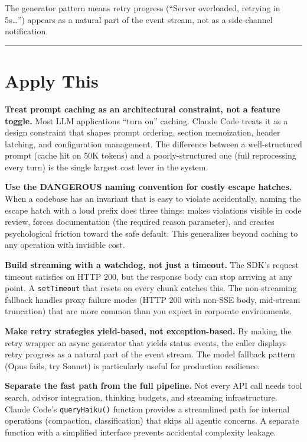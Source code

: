 \documentclass[
  english,
  11pt,
  letterpaper,
]{book}
\begin{document}
The generator pattern means retry progress (``Server overloaded,
retrying in 5s\ldots{}'') appears as a natural part of the event stream,
not as a side-channel notification.

\begin{center}\rule{0.5\linewidth}{0.5pt}\end{center}

\section{Apply This}\label{apply-this-3}

\textbf{Treat prompt caching as an architectural constraint, not a
feature toggle.} Most LLM applications ``turn on'' caching. Claude Code
treats it as a design constraint that shapes prompt ordering, section
memoization, header latching, and configuration management. The
difference between a well-structured prompt (cache hit on 50K tokens)
and a poorly-structured one (full reprocessing every turn) is the single
largest cost lever in the system.

\textbf{Use the DANGEROUS naming convention for costly escape hatches.}
When a codebase has an invariant that is easy to violate accidentally,
naming the escape hatch with a loud prefix does three things: makes
violations visible in code review, forces documentation (the required
reason parameter), and creates psychological friction toward the safe
default. This generalizes beyond caching to any operation with invisible
cost.

\textbf{Build streaming with a watchdog, not just a timeout.} The SDK's
request timeout satisfies on HTTP 200, but the response body can stop
arriving at any point. A \texttt{setTimeout} that resets on every chunk
catches this. The non-streaming fallback handles proxy failure modes
(HTTP 200 with non-SSE body, mid-stream truncation) that are more common
than you expect in corporate environments.

\textbf{Make retry strategies yield-based, not exception-based.} By
making the retry wrapper an async generator that yields status events,
the caller displays retry progress as a natural part of the event
stream. The model fallback pattern (Opus fails, try Sonnet) is
particularly useful for production resilience.

\textbf{Separate the fast path from the full pipeline.} Not every API
call needs tool search, advisor integration, thinking budgets, and
streaming infrastructure. Claude Code's \texttt{queryHaiku()} function
provides a streamlined path for internal operations (compaction,
classification) that skips all agentic concerns. A separate function
with a simplified interface prevents accidental complexity leakage.
\end{document}
